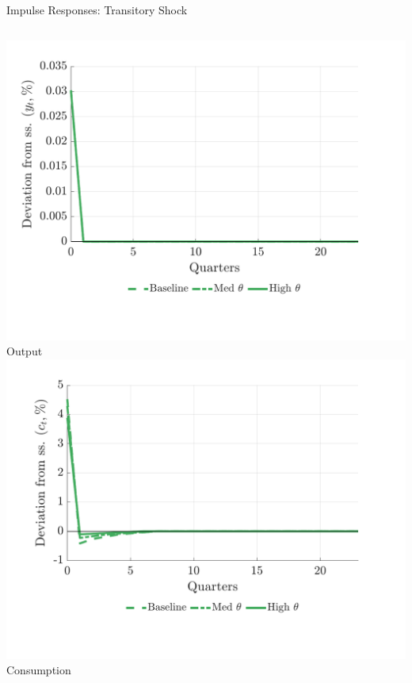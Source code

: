 \documentclass[aspectratio=169,11pt,professionalfonts]{beamer}
\newcommand{\1}{\mathbb{1}}
\begin{document}
\begin{frame}{Impulse Responses: Transitory Shock}
  \begin{columns}[T,onlytextwidth]
    \includegraphics[width=\linewidth]{comparison_figure_13.pdf}\\[-0.5em]
    {\scriptsize Output}
    \includegraphics[width=\linewidth]{comparison_figure_15.pdf}\\[-0.5em]
    {\scriptsize Consumption}

\end{columns}
\end{frame}
\end{document}
